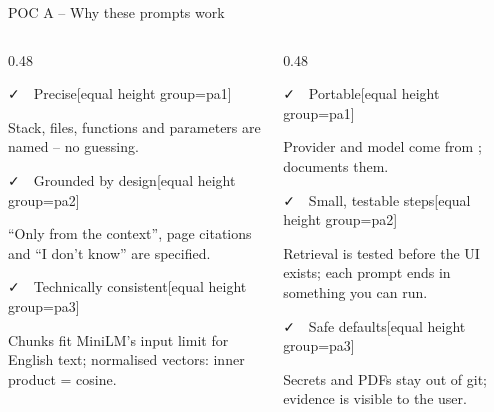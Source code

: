 \documentclass[aspectratio=169,11pt]{beamer}
\newcommand{\file}[1]{\leavevmode{\ttfamily\color{accent}#1}}
\begin{document}
\begin{frame}{POC A -- Why these prompts work}
  \begin{columns}[T]
    \begin{column}{0.48\textwidth}
      \begin{card}[cNavy]{\faCheck\ \ Precise}[equal height group=pa1]
        \raggedright\footnotesize Stack, files, functions and parameters are named -- no guessing.
      \end{card}
      \vspace{4pt}
      \begin{card}[cTeal]{\faCheck\ \ Grounded by design}[equal height group=pa2]
        \raggedright\footnotesize ``Only from the context'', page citations and ``I don't know'' are specified.
      \end{card}
      \vspace{4pt}
      \begin{card}[cBlue]{\faCheck\ \ Technically consistent}[equal height group=pa3]
        \raggedright\footnotesize Chunks fit MiniLM's input limit for English text; normalised vectors: inner product = cosine.
      \end{card}
    \end{column}
    \begin{column}{0.48\textwidth}
      \begin{card}[cPurple]{\faCheck\ \ Portable}[equal height group=pa1]
        \raggedright\footnotesize Provider and model come from \file{.env}; \file{.env.example} documents them.
      \end{card}
      \vspace{4pt}
      \begin{card}[cGreen]{\faCheck\ \ Small, testable steps}[equal height group=pa2]
        \raggedright\footnotesize Retrieval is tested before the UI exists; each prompt ends in something you can run.
      \end{card}
      \vspace{4pt}
      \begin{card}[cOrange]{\faCheck\ \ Safe defaults}[equal height group=pa3]
        \raggedright\footnotesize Secrets and PDFs stay out of git; evidence is visible to the user.
      \end{card}
    \end{column}
  \end{columns}
\end{frame}
\end{document}
